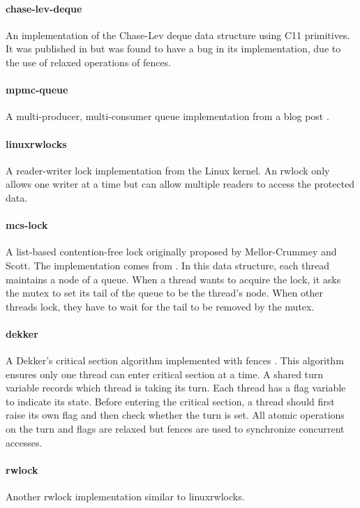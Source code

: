 \paragraph{chase-lev-deque} An implementation of the Chase-Lev deque data structure using C11 primitives. It was published in \cite{chase-lev-deque-impl} but was found to have a bug in its implementation, due to the use of relaxed operations of fences.

\paragraph{mpmc-queue} A multi-producer, multi-consumer queue implementation from a blog post \cite{mpmc-queue-impl}.

\paragraph{linuxrwlocks} A reader-writer lock implementation from the Linux kernel. An rwlock only allows one writer at a time but can allow multiple readers to access the protected data.


\paragraph{mcs-lock} A list-based contention-free lock originally proposed by Mellor-Crummey and Scott\cite{mcs-lock}. The implementation comes from \cite{mcs-lock-impl}. In this data structure, each thread maintains a node of a queue. When a thread wants to acquire the lock, it asks the mutex to set its tail of the queue to be the thread's node. When other threads lock, they have to wait for the tail to be removed by the mutex.

\paragraph{dekker} A Dekker's critical section algorithm implemented with fences \cite{dekker-fence-impl}. This algorithm ensures only one thread can enter critical section at a time. A shared turn variable records which thread is taking its turn. Each thread has a flag variable to indicate its state. Before entering the critical section, a thread should first raise its own flag and then check whether the turn is set. All atomic operations on the turn and flags are relaxed but fences are used to synchronize concurrent accesses.

\paragraph{rwlock} Another rwlock implementation similar to linuxrwlocks.
